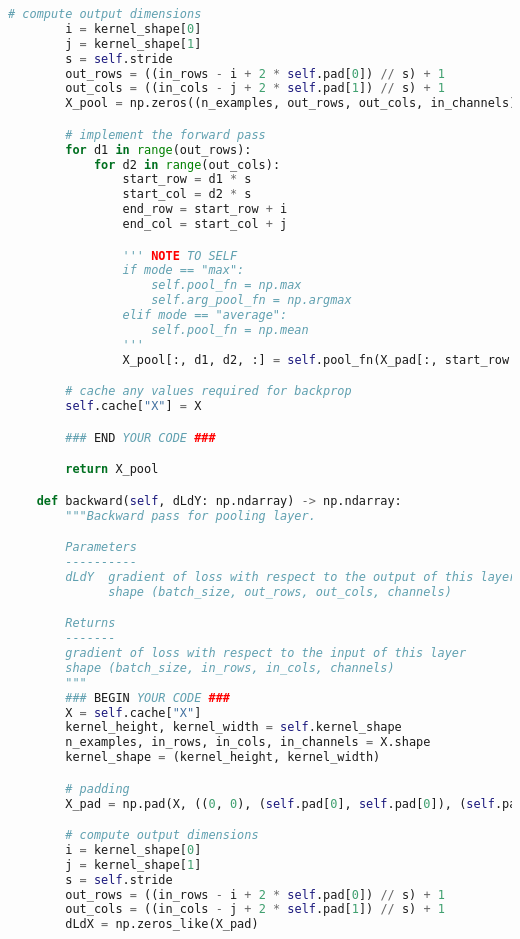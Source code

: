 \begin{lstlisting}[language=Python]
        # compute output dimensions
        i = kernel_shape[0]
        j = kernel_shape[1]
        s = self.stride
        out_rows = ((in_rows - i + 2 * self.pad[0]) // s) + 1
        out_cols = ((in_cols - j + 2 * self.pad[1]) // s) + 1
        X_pool = np.zeros((n_examples, out_rows, out_cols, in_channels))

        # implement the forward pass
        for d1 in range(out_rows):
            for d2 in range(out_cols):
                start_row = d1 * s
                start_col = d2 * s
                end_row = start_row + i
                end_col = start_col + j

                ''' NOTE TO SELF
                if mode == "max":
                    self.pool_fn = np.max
                    self.arg_pool_fn = np.argmax
                elif mode == "average":
                    self.pool_fn = np.mean
                '''
                X_pool[:, d1, d2, :] = self.pool_fn(X_pad[:, start_row:end_row, start_col:end_col, :], axis=(1,2))

        # cache any values required for backprop
        self.cache["X"] = X

        ### END YOUR CODE ###

        return X_pool

    def backward(self, dLdY: np.ndarray) -> np.ndarray:
        """Backward pass for pooling layer.

        Parameters
        ----------
        dLdY  gradient of loss with respect to the output of this layer
              shape (batch_size, out_rows, out_cols, channels)

        Returns
        -------
        gradient of loss with respect to the input of this layer
        shape (batch_size, in_rows, in_cols, channels)
        """
        ### BEGIN YOUR CODE ###
        X = self.cache["X"]
        kernel_height, kernel_width = self.kernel_shape
        n_examples, in_rows, in_cols, in_channels = X.shape
        kernel_shape = (kernel_height, kernel_width)

        # padding
        X_pad = np.pad(X, ((0, 0), (self.pad[0], self.pad[0]), (self.pad[1], self.pad[1]), (0, 0)), mode='constant')

        # compute output dimensions
        i = kernel_shape[0]
        j = kernel_shape[1]
        s = self.stride
        out_rows = ((in_rows - i + 2 * self.pad[0]) // s) + 1
        out_cols = ((in_cols - j + 2 * self.pad[1]) // s) + 1
        dLdX = np.zeros_like(X_pad)


\end{lstlisting}
